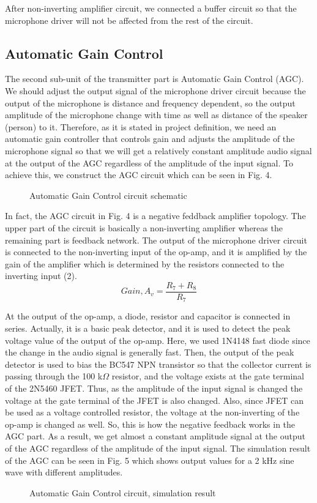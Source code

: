 \documentclass[conference]{IEEEtran}
\begin{document}
\par After non-inverting amplifier circuit, we connected a buffer circuit so that the microphone driver will not be affected from the rest of the circuit. 
\subsection{Automatic Gain Control}
The second sub-unit of the transmitter part is Automatic Gain Control (AGC). We should adjust the output signal of the microphone driver circuit because the output of the microphone is distance and frequency dependent, so the output amplitude of the microphone change with time as well as distance of the speaker (person) to it. Therefore, as it is stated in project definition, we need an automatic gain controller that controls gain and adjusts the amplitude of the microphone signal so that we will get a relatively constant amplitude audio signal at the output of the AGC regardless of the amplitude of the input signal. To achieve this, we construct the AGC circuit which can be seen in Fig. 4.
 \begin{figure}[H]
   \centerline{}
    \caption{Automatic Gain Control circuit schematic}
\end{figure}
\par In fact, the AGC circuit in Fig. 4 is a negative feddback amplifier topology. The upper part of the circuit is basically a non-inverting amplifier whereas the remaining part is feedback network. The output of the microphone driver circuit is connected to the non-inverting input of the op-amp, and it is amplified by the gain of the amplifier which is determined by the resistors connected to the inverting input (2). 
\begin{equation}\label{eq:2}
        Gain, A_v = \frac{R_7+R_8}{R_7} 
 \end{equation}
\par At the output of the op-amp, a diode, resistor and capacitor is connected in series. Actually, it is a basic peak detector, and it is used to detect the peak voltage value of the output of the op-amp. Here, we used 1N4148 fast diode \cite{1N4148} since the change in the audio signal is generally fast. Then, the output of the peak detector is used to bias the BC547 NPN transistor so that the collector current is passing through the 100 k\(\Omega\) resistor, and the voltage exists at the gate terminal of the 2N5460 JFET. Thus, as the amplitude of the input signal is changed the voltage at the gate terminal of the JFET is also changed. Also, since JFET can be used as a voltage controlled resistor, the voltage at the non-inverting of the op-amp is changed as well. So, this is how the negative feedback works in the AGC part. As a result, we get almost a constant amplitude signal at the output of the AGC regardless of the amplitude of the input signal. The simulation result of the AGC can be seen in Fig. 5 which shows output values for a 2 kHz sine wave with different amplitudes.
 \begin{figure}[H]
   \centerline{}
    \caption{Automatic Gain Control circuit, simulation result}
\end{figure}
\end{document}
